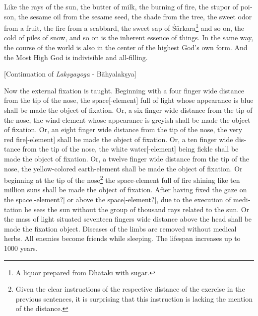 \begin{otherlanguage}{english}
\begin{tlate}
Like the rays of the sun, the butter of milk, the burning of fire, the stupor of poison, the sesame oil from the sesame seed, the shade from the tree, the sweet odor from a fruit, the fire from a scabbard, the sweet sap of Śārkara\footnote{A liquor prepared from Dhātakī with sugar.} and so on, the cold of piles of snow, and so on is the inherent essence of things. In the same way, the course of the world is also in the center of the highest God's own form. And the Most High God is indivisible and all-filling.
\end{tlate}
\begin{tlate}
   \bigskip
        \centerline{\textrm{\small{[Continuation of \textit{Lakṣyayoga} - Bāhyalakṣya]}}}
          \bigskip
Now the external fixation is taught. Beginning with a four finger wide distance from the tip of the nose, the space[-element] full of light whose appearance is blue shall be made the object of fixation. Or, a six finger wide distance from the tip of the nose, the wind-element whose appearance is greyish shall be made the object of fixation. Or, an eight finger wide distance from the tip of the nose, the very red fire[-element] shall be made the object of fixation. Or, a ten finger wide distance from the tip of the nose, the white water[-element] being fickle shall be made the object of fixation. Or, a twelve finger wide distance from the tip of the nose, the yellow-colored earth-element shall be made the object of fixation. Or beginning at the tip of the nose\footnote{Given the clear instructions of the respective distance of the exercise in the previous sentences, it is surprising that this instruction is lacking the mention of the distance.} the space-element full of fire shining like ten million suns shall be made the object of fixation. After having fixed the gaze on the space[-element?] or above the space[-element?], due to the execution of meditation he sees the sun without the group of thousand rays related to the sun. Or the mass of light situated seventeen fingers wide distance above the head shall be made the fixation object. Diseases of the limbs are removed without medical herbs. All enemies become friends while sleeping. The lifespan increases up to 1000 years. 
\end{tlate}
\begin{tlate}

\end{tlate}
\end{otherlanguage}
